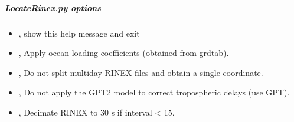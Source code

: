 \documentclass[letterpaper,10pt,english]{sphinxmanual}
\begin{document}
\subparagraph{LocateRinex.py options}
\label{\detokenize{pgamit.com:LocateRinex.py-options}}\begin{itemize}
\item {} 
\sphinxAtStartPar
{\hyperref[\detokenize{pgamit.com:LocateRinex.py--h}]{}}, {\hyperref[\detokenize{pgamit.com:LocateRinex.py---help}]{}} \sphinxhyphen{} show this help message and exit

\item {} 
\sphinxAtStartPar
{\hyperref[\detokenize{pgamit.com:LocateRinex.py--otl}]{}}, {\hyperref[\detokenize{pgamit.com:LocateRinex.py---ocean_loading}]{}} \sphinxhyphen{} Apply ocean loading coefficients (obtained from grdtab).

\item {} 
\sphinxAtStartPar
{\hyperref[\detokenize{pgamit.com:LocateRinex.py--ns}]{}}, {\hyperref[\detokenize{pgamit.com:LocateRinex.py---no_split}]{}} \sphinxhyphen{} Do not split multiday RINEX files and obtain a single coordinate.

\item {} 
\sphinxAtStartPar
{\hyperref[\detokenize{pgamit.com:LocateRinex.py--no_met}]{}}, {\hyperref[\detokenize{pgamit.com:LocateRinex.py---no_met}]{}} \sphinxhyphen{} Do not apply the GPT2 model to correct tropospheric delays (use GPT).

\item {} 
\sphinxAtStartPar
{\hyperref[\detokenize{pgamit.com:LocateRinex.py--dec}]{}}, {\hyperref[\detokenize{pgamit.com:LocateRinex.py---decimate}]{}} \sphinxhyphen{} Decimate RINEX to 30 s if interval \textless{} 15.


\end{itemize}
\end{document}
